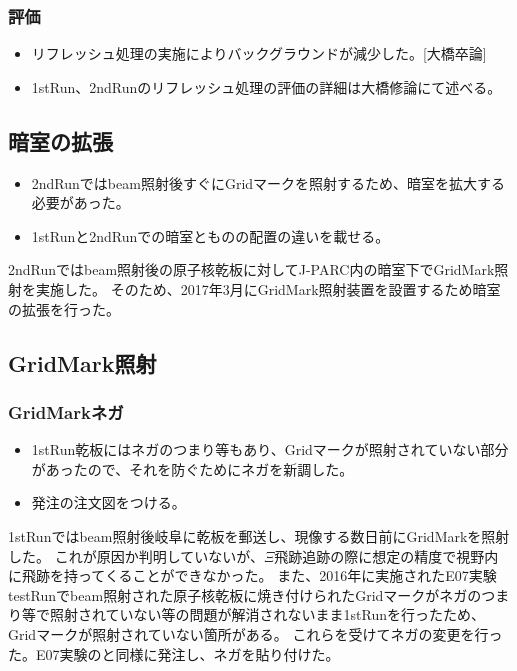 \documentclass[12pt,a4paper]{jarticle}
\begin{document}
\subsubsection{評価}
\begin{itemize}
 \item リフレッシュ処理の実施によりバックグラウンドが減少した。[大橋卒論]
 \item 1stRun、2ndRunのリフレッシュ処理の評価の詳細は大橋修論にて述べる。
\end{itemize}
\subsection{暗室の拡張}
\begin{itemize}
 \item 2ndRunではbeam照射後すぐにGridマークを照射するため、暗室を拡大する必要があった。
 \item 1stRunと2ndRunでの暗室とものの配置の違いを載せる。
\end{itemize}
2ndRunではbeam照射後の原子核乾板に対してJ-PARC内の暗室下でGridMark照射を実施した。
そのため、2017年3月にGridMark照射装置を設置するため暗室の拡張を行った。
\par
\subsection{GridMark照射}
\subsubsection{GridMarkネガ}
\begin{itemize}
 \item 1stRun乾板にはネガのつまり等もあり、Gridマークが照射されていない部分があったので、それを防ぐためにネガを新調した。
 \item 発注の注文図をつける。
\end{itemize}
1stRunではbeam照射後岐阜に乾板を郵送し、現像する数日前にGridMarkを照射した。
これが原因か判明していないが、$\Xi$飛跡追跡の際に想定の精度で視野内に飛跡を持ってくることができなかった。
また、2016年に実施されたE07実験testRunでbeam照射された原子核乾板に焼き付けられたGridマークがネガのつまり等で照射されていない等の問題が解消されないまま1stRunを行ったため、Gridマークが照射されていない箇所がある。
これらを受けてネガの変更を行った。E07実験のと同様に発注し、ネガを貼り付けた。
\end{document}

